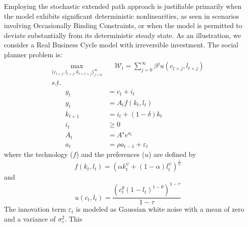 \documentclass[a4paper,11pt]{amsart}
\begin{document}
Employing the stochastic extended path approach is justifiable
primarily when the model exhibits significant deterministic
nonlinearities, as seen in scenarios involving Occasionally Binding
Constraints, or when the model is permitted to deviate substantially
from its deterministic steady state. As an illustration, we consider a
Real Business Cycle model with irreversible investment. The social
planner problem is:
\begin{equation*}
   \begin{split}
      \max_{\{c_{t+j},l_{t+j},k_{t+1+j}\}_{j=0}^{\infty}} & \quad \mathcal W_t = \sum_{j=0}^{\infty}\beta^ju(c_{t+j},l_{t+j}) \\
      \underline{s.t.}                                    &                                                                   \\
      \qquad y_t                                          & = c_t + i_t                                                       \\
      \qquad y_t                                          & = A_tf(k_t,l_t)                                                   \\
      \qquad k_{t+1}                                      & = i_t + (1-\delta)k_t                                             \\
      \qquad i_t                                          & \geq 0                                                            \\
      \qquad A_{t}                                        & = {A^{\star}}e^{a_{t}}                                            \\
      \qquad a_{t}                                        & = \rho a_{t-1} + \varepsilon_t
   \end{split}
\end{equation*}
where the technology ($f$) and the preferences ($u$) are defined by
\begin{equation*}
   f(k_t,l_t) = \left(\alpha k_t^{\psi} + (1-\alpha)l_t^{\psi}\right)^{\frac{1}{\psi}}
\end{equation*}
and
\begin{equation*}
   u(c_t,l_t) = \frac{\left(c_t^{\theta}(1-l_t)^{1-\theta}\right)^{1-\tau}}{1-\tau}
\end{equation*}
The innovation term $\varepsilon_t$ is modeled as Gaussian white noise
with a mean of zero and a variance of $\sigma_{\varepsilon}^2$. This
\end{document}
